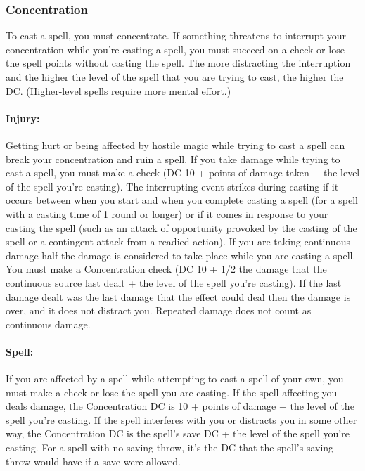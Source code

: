 \subsubsection{Concentration}
To cast a spell, you must concentrate. If something threatens to interrupt your concentration while you're casting a spell, you must succeed on a  check or lose the spell points without casting the spell. 
The more distracting the interruption and the higher the level of the spell that you are trying to cast, the higher the DC. 
(Higher-level spells require more mental effort.)

\paragraph{Injury:} Getting hurt or being affected by hostile magic while trying to cast a spell can break your concentration and ruin a spell. 
If you take damage while trying to cast a spell, you must make a  check (DC 10 + points of damage taken + the level of the spell you're casting). 
The interrupting event strikes during casting if it occurs between when you start and when you complete casting a spell (for a spell with a casting time of 1 round or longer) or if it comes in response to your casting the spell (such as an attack of opportunity provoked by the casting of the spell or a contingent attack from a readied action).
If you are taking continuous damage half the damage is considered to take place while you are casting a spell. 
You must make a Concentration check (DC 10 + 1/2 the damage that the continuous source last dealt + the level of the spell you're casting).
If the last damage dealt was the last damage that the effect could deal then the damage is over, and it does not distract you.
Repeated damage does not count as continuous damage.

\paragraph{Spell:} If you are affected by a spell while attempting to cast a spell of your own, you must make a  check or lose the spell you are casting.
If the spell affecting you deals damage, the Concentration DC is 10 + points of damage + the level of the spell you're casting. 
If the spell interferes with you or distracts you in some other way, the Concentration DC is the spell's save DC + the level of the spell you're casting. 
For a spell with no saving throw, it's the DC that the spell's saving throw would have if a save were allowed.

